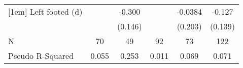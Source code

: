 {\begin{tabular}{l*{5}{c}}
[1em]
Left footed (d)     &                     &      -0.300\sym{**} &                     &     -0.0384         &      -0.127         \\
                    &                     &     (0.146)         &                     &     (0.203)         &     (0.139)         \\
\hline
N                   &          70         &          49         &          92         &          73         &         122         \\
Pseudo R-Squared    &       0.055         &       0.253         &       0.011         &       0.069         &       0.071         \\
\hline\hline
\end{tabular}
}

